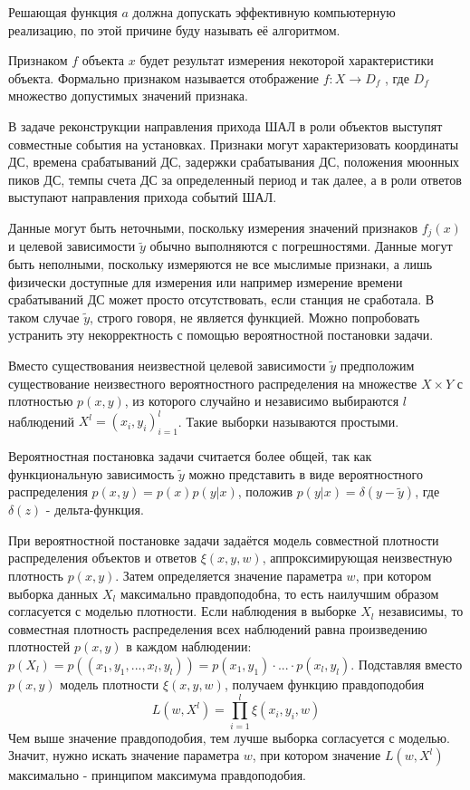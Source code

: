 Решающая функция \(a\) должна допускать эффективную компьютерную реализацию, по этой причине буду называть её алгоритмом.

Признаком \(f\) объекта \(x\) будет результат измерения некоторой характеристики объекта. Формально признаком называется отображение \(f : X \to D_f\) , где \(D_f\)
множество допустимых значений признака.

В задаче реконструкции направления прихода ШАЛ в роли объектов выступят совместные события на установках. Признаки могут характеризовать координаты ДС, времена срабатываний ДС, задержки срабатывания ДС, положения мюонных пиков ДС, темпы счета ДС за определенный период и так далее, а в роли ответов выступают направления прихода событий ШАЛ.

Данные могут быть неточными, поскольку измерения значений признаков \(f_j(x)\) и целевой зависимости \(\tilde{y}\) обычно выполняются с погрешностями. Данные могут быть неполными, поскольку измеряются не все мыслимые признаки, а лишь физически доступные для измерения или например измерение времени срабатываний ДС может просто отсутствовать, если станция не сработала. В таком случае \(\tilde{y}\), строго говоря, не является функцией. Можно попробовать устранить эту некорректность с помощью вероятностной постановки задачи.

Вместо существования неизвестной целевой зависимости \(\tilde{y}\) предположим существование неизвестного вероятностного распределения на множестве \(X \times Y\)
с плотностью \(p(x, y)\), из которого случайно и независимо выбираются \(l\) наблюдений
\(X^l = (x_i, y_i)^{l}_{i=1}\). Такие выборки называются простыми.

Вероятностная постановка задачи считается более общей, так как функциональную зависимость \(\tilde{y}\) можно представить в виде вероятностного распределения \(p(x, y) = p(x)p(y|x)\), положив \(p(y|x) = \delta(y - \tilde{y})\), где \(\delta(z)\) - дельта-функция.

При вероятностной постановке задачи задаётся модель совместной плотности распределения объектов и ответов \(\xi(x, y, w)\), аппроксимирующая неизвестную плотность \(p(x, y)\). Затем определяется значение параметра \(w\), при котором выборка данных \(X_l\) максимально правдоподобна, то есть наилучшим образом согласуется с моделью плотности. Если наблюдения в выборке \(X_l\) независимы, то совместная плотность распределения всех наблюдений равна произведению плотностей \(p(x, y)\) в каждом наблюдении: \(p(X_l) = p((x_1,y_1, ..., x_l, y_l))= p(x_1,y_1) \cdot ... \cdot p(x_l,y_l)\). Подставляя вместо \(p(x, y)\) модель плотности \(\xi(x, y, w)\), получаем функцию правдоподобия
\begin{equation}
L(w, X^l) = \prod_{i=1}^l \xi(x_i,y_i,w)
\end{equation}
Чем выше значение правдоподобия, тем лучше выборка согласуется с моделью. Значит, нужно искать значение параметра \(w\), при котором значение \(L(w, X^l)\) максимально - принципом максимума правдоподобия.

